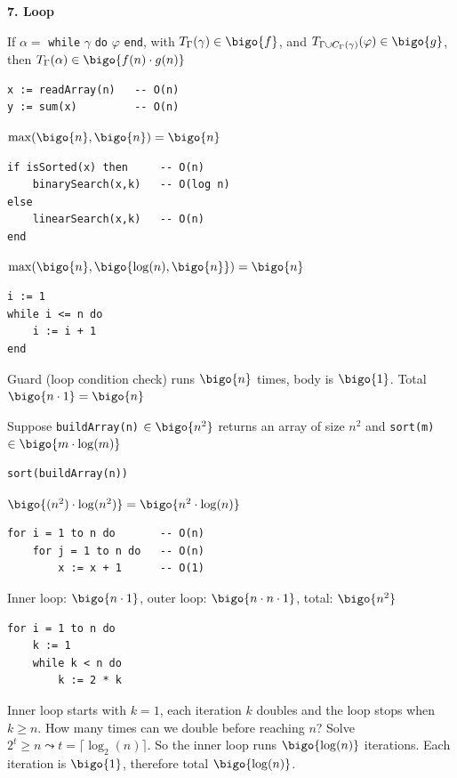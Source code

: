 \textbf{7. Loop}

If $\alpha = $ \texttt{while} $\gamma$ \texttt{do} $\varphi$ \texttt{end}, with $T_{\Gamma}(\gamma) \in \bigo{f}$, and $T_{\Gamma \cup C_{\Gamma}(\gamma)}(\varphi) \in \bigo{g}$, then $T_{\Gamma} (\alpha) \in \bigo{f(n) \cdot g(n)}$


\begin{verbatim}
x := readArray(n)   -- O(n)
y := sum(x)         -- O(n)
\end{verbatim}
$\operatorname{max}(\bigo{n},\bigo{n}) = \bigo{n}$

\begin{verbatim}
if isSorted(x) then     -- O(n)
    binarySearch(x,k)   -- O(log n)
else
    linearSearch(x,k)   -- O(n)
end
\end{verbatim}
$\operatorname{max}(\bigo{n}, \bigo{\operatorname{log} (n), \bigo{n}}) = \bigo{n}$

\begin{verbatim}
i := 1
while i <= n do 
    i := i + 1
end
\end{verbatim}
Guard (loop condition check) runs $\bigo{n}$ times, body is $\bigo{1}$. Total $\bigo{n \cdot 1} = \bigo{n}$

Suppose \texttt{buildArray(n)} $\in \bigo{n^2}$ returns an array  of size $n^2$ and \texttt{sort(m)} $\in \bigo{m \cdot \operatorname{log}(m)}$
\begin{verbatim}
sort(buildArray(n))
\end{verbatim}
$\bigo{(n^2) \cdot \operatorname{log} (n^2)} = \bigo{n^2 \cdot \operatorname{log} (n)}$

\begin{verbatim}
for i = 1 to n do       -- O(n)
    for j = 1 to n do   -- O(n)
        x := x + 1      -- O(1)
\end{verbatim}
Inner loop: $\bigo{n \cdot 1}$, outer loop: $\bigo{n \cdot n \cdot 1}$, total: $\bigo{n^2}$

\begin{verbatim}
for i = 1 to n do
    k := 1
    while k < n do
        k := 2 * k
\end{verbatim}
Inner loop starts with $k=1$, each iteration $k$ doubles and the loop stops when $k \geq n$. How many times can we double before reaching $n$? Solve $2^t \geq n \leadsto t = \lceil \operatorname{log}_2 (n) \rceil$. So the inner loop runs $\bigo{\operatorname{log}(n)}$ iterations. Each iteration is $\bigo{1}$, therefore total $\bigo{\operatorname{log}(n)}$.

